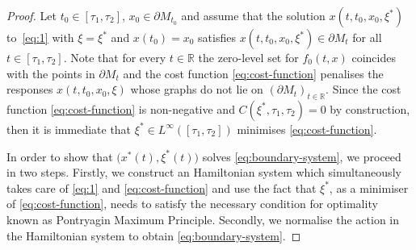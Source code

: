 \documentclass[reqno]{amsart}
\theoremstyle{definition}
\numberwithin{equation}{section}
\newcommand{\R}{\mathbb{R}}
\begin{document}
\begin{proof}

Let $t_0\in[\tau_1,\tau_2]$, $x_0\in\partial M_{t_0}$ and assume that the solution $x(t,t_0,x_0,\xi^*)$ to~\eqref{eq:1} with $\xi=\xi^*$ and $x(t_0)=x_0$ satisfies $x(t,t_0,x_0,\xi^*)\in\partial M_t$ for all $t\in[\tau_1,\tau_2]$. Note that for every $t\in\R$ the zero-level set for $f_0(t,x)$ coincides with the points in $\partial M_t$ and the cost function \eqref{eq:cost-function} penalises the responses $x(t,t_0,x_0,\xi)$ whose graphs do not lie on  $(\partial M_t)_{t\in\R}$. 
Since the cost function \eqref{eq:cost-function} is non-negative and $C(\xi^*,\tau_1,\tau_2)=0$ by construction, then it is immediate that $\xi^*\in L^\infty([\tau_1,\tau_2])$ minimises \eqref{eq:cost-function}. \smallskip

In order to show that $\big(x^*(t),\xi^*(t)\big)$ solves \eqref{eq:boundary-system}, we proceed in two steps. Firstly, we construct an Hamiltonian system which simultaneously takes care of \eqref{eq:1} and \eqref{eq:cost-function} and use the fact that $\xi^*$, as a minimiser of \eqref{eq:cost-function}, needs to satisfy the necessary condition for optimality known as Pontryagin Maximum Principle. Secondly, we normalise the action in the  Hamiltonian system to obtain \eqref{eq:boundary-system}.\smallskip


\end{proof}
\end{document}
